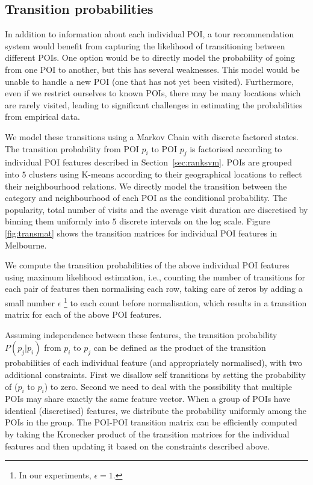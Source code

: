 \subsection{Transition probabilities}
\label{sec:transition}

In addition to information about each individual POI, a tour recommendation system would benefit
from capturing the likelihood of transitioning between different POIs. One option would be to
directly model the probability of going from one POI to another, but this has several weaknesses.
This model would be unable to handle a new POI (one that has not yet been visited).
Furthermore, even if we restrict ourselves to known POIs, there may be many locations which
are rarely visited, leading to significant challenges in estimating the probabilities from
empirical data.

We model these transitions using a Markov Chain with discrete factored states.
The transition probability from POI $p_i$ to POI $p_j$ is factorised according to
individual POI features described in Section~\ref{sec:ranksvm}.
POIs are grouped into $5$ clusters using K-means according to their geographical locations
to reflect their neighbourhood relations.
We directly model the transition between the category and neighbourhood of each POI as the conditional probability.
The popularity, total number of visits and the average visit duration are discretised by binning
them uniformly into $5$ discrete intervals on the log scale.
Figure \ref{fig:transmat} shows the transition matrices for individual POI features in Melbourne.

We compute the transition probabilities of the above individual POI features
using maximum likelihood estimation,
i.e., counting the number of transitions for each pair of features then normalising each row,
taking care of zeros by adding a small number $\epsilon$
\footnote{In our experiments, $\epsilon = 1$.}
to each count before normalisation,
which results in a transition matrix for each of the above POI features.

Assuming independence between these features,
the transition probability $P(p_j | p_i)$ from $p_i$ to $p_j$ can be defined as the product
of the transition probabilities of each individual feature (and appropriately normalised),
with two additional constraints.
First we disallow self transitions by setting the probability of ($p_i$ to $p_i$) to zero.
Second we need to deal with the possibility that multiple POIs may share exactly the same
feature vector.
When a group of POIs have identical (discretised) features, we distribute the probability
uniformly among the POIs in the group. 
The POI-POI transition matrix can be efficiently computed by taking the Kronecker product of
the transition matrices for the individual features and then updating it based on the constraints described above.

